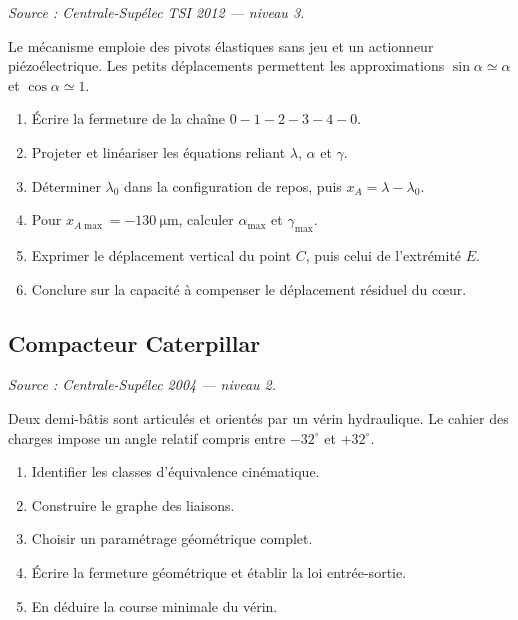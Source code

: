 \textit{Source : Centrale-Supélec TSI 2012 — niveau 3.}

Le mécanisme emploie des pivots élastiques sans jeu et un actionneur
piézoélectrique. Les petits déplacements permettent les approximations
$\sin\alpha\simeq\alpha$ et $\cos\alpha\simeq1$.

\begin{center}
\hfill
{}\hfill
{}
\end{center}

\begin{enumerate}
  \item Écrire la fermeture de la chaîne $0-1-2-3-4-0$.
  \item Projeter et linéariser les équations reliant $\lambda$, $\alpha$ et $\gamma$.
  \item Déterminer $\lambda_0$ dans la configuration de repos, puis $x_A=\lambda-\lambda_0$.
  \item Pour $x_{A\max}=-130\ \mathrm{\mu m}$, calculer $\alpha_{\max}$ et $\gamma_{\max}$.
  \item Exprimer le déplacement vertical du point $C$, puis celui de l'extrémité $E$.
  \item Conclure sur la capacité à compenser le déplacement résiduel du cœur.
\end{enumerate}

\subsection{Compacteur Caterpillar}

\textit{Source : Centrale-Supélec 2004 — niveau 2.}

Deux demi-bâtis sont articulés et orientés par un vérin hydraulique. Le
cahier des charges impose un angle relatif compris entre $-32^\circ$ et
$+32^\circ$.


\begin{enumerate}
  \item Identifier les classes d'équivalence cinématique.
  \item Construire le graphe des liaisons.
  \item Choisir un paramétrage géométrique complet.
  \item Écrire la fermeture géométrique et établir la loi entrée-sortie.
  \item En déduire la course minimale du vérin.
\end{enumerate}

